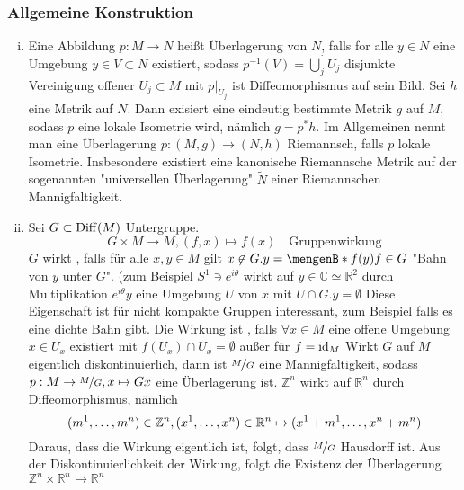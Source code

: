 \subsubsection{Allgemeine Konstruktion}
\label{ssub:24}
\begin{enumerate}[(i)]
\item Eine Abbildung $p:M\to N$ heißt Überlagerung von $N$, falls for alle $y\in N$ eine Umgebung $y\in V\subset N$ existiert, sodass $p^{-1}(V) = \dot{\bigcup_j}U_j$ disjunkte Vereinigung offener $U_j \subset M$ mit $p\vert_{U_j}$ ist Diffeomorphismus auf sein Bild.
Sei $h$ eine Metrik auf $N$. Dann exisiert eine eindeutig bestimmte Metrik $g$ auf $M$, sodass $p$ eine lokale Isometrie wird, nämlich $g = p^* h$. Im Allgemeinen nennt man eine Überlagerung $p:(M,g)\to (N,h)$ Riemannsch, falls $p$ lokale Isometrie. Insbesondere existiert eine kanonische Riemannsche Metrik auf der sogenannten "universellen Überlagerung" $\tilde{N}$ einer Riemannschen Mannigfaltigkeit. 
\item Sei $G\subset \operatorname{Diff}(M)$ Untergruppe.
\[
G\times M\to M, (f,x)\mapsto f(x)\quad \text{Gruppenwirkung}
\]
$G$ wirkt , falls für alle $x,y \in M$ gilt $x\not\in G.y = \set[f(y)]{f\in G}$ "Bahn von $y$ unter $G$". (zum Beispiel $S^1 \ni e^{i\theta}$ wirkt auf $y\in \mathds{C}\simeq \mathds{R}^2$ durch Multiplikation $e^{i\theta} y$
eine Umgebung $U$ von $x$ mit $U\cap G.y = \emptyset$
 Diese Eigenschaft ist für nicht kompakte Gruppen interessant, zum Beispiel falls es eine dichte Bahn gibt.
Die Wirkung ist , falls $\forall x\in M$ eine offene Umgebung $x\in U_x$ existiert mit $f(U_x)\cap U_x = \emptyset$ außer für $f = \operatorname{id}_M$
Wirkt $G$ auf $M$ eigentlich diskontinuierlich, dann ist $\nicefrac{M}{G}$ eine Mannigfaltigkeit, sodass $p:M\to \nicefrac{M}{G}, x\mapsto Gx$ eine Überlagerung ist.
$\mathds{Z}^n$ wirkt auf $\mathds{R}^n$ durch Diffeomorphismus, nämlich
\[
(m^1,\ldots,m^n)\in \mathbb{Z}^n, (x^1,\ldots,x^n)\in \mathbb{R}^n \mapsto (x^1+m^1,\ldots,x^n+m^n)
\]
Daraus, dass die Wirkung eigentlich ist, folgt, dass $\nicefrac{M}{G}$ Hausdorff ist.
Aus der Diskontinuierlichkeit der Wirkung, folgt die Existenz der Überlagerung $\mathds{Z}^n \times \mathds{R}^n \to \mathds{R}^n$
\end{enumerate}

